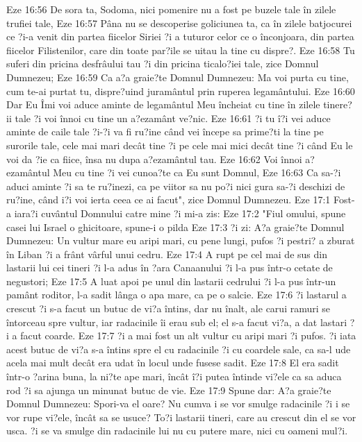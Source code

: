Eze 16:56  De sora ta, Sodoma, nici pomenire nu a fost pe buzele tale în zilele trufiei tale,
Eze 16:57  Pâna nu se descoperise goliciunea ta, ca în zilele batjocurei ce ?i-a venit din partea fiicelor Siriei ?i a tuturor celor ce o înconjoara, din partea fiicelor Filistenilor, care din toate par?ile se uitau la tine cu dispre?.
Eze 16:58  Tu suferi din pricina desfrâului tau ?i din pricina ticalo?iei tale, zice Domnul Dumnezeu;
Eze 16:59  Ca a?a graie?te Domnul Dumnezeu: Ma voi purta cu tine, cum te-ai purtat tu, dispre?uind juramântul prin ruperea legamântului.
Eze 16:60  Dar Eu Îmi voi aduce aminte de legamântul Meu încheiat cu tine în zilele tinere?ii tale ?i voi înnoi cu tine un a?ezamânt ve?nic.
Eze 16:61  ?i tu î?i vei aduce aminte de caile tale ?i-?i va fi ru?ine când vei începe sa prime?ti la tine pe surorile tale, cele mai mari decât tine ?i pe cele mai mici decât tine ?i când Eu le voi da ?ie ca fiice, însa nu dupa a?ezamântul tau.
Eze 16:62  Voi înnoi a?ezamântul Meu cu tine ?i vei cunoa?te ca Eu sunt Domnul,
Eze 16:63  Ca sa-?i aduci aminte ?i sa te ru?inezi, ca pe viitor sa nu po?i nici gura sa-?i deschizi de ru?ine, când i?i voi ierta ceea ce ai facut", zice Domnul Dumnezeu.
Eze 17:1  Fost-a iara?i cuvântul Domnului catre mine ?i mi-a zis:
Eze 17:2  "Fiul omului, spune casei lui Israel o ghicitoare, spune-i o pilda
Eze 17:3  ?i zi: A?a graie?te Domnul Dumnezeu: Un vultur mare eu aripi mari, cu pene lungi, pufos ?i pestri? a zburat în Liban ?i a frânt vârful unui cedru.
Eze 17:4  A rupt pe cel mai de sus din lastarii lui cei tineri ?i l-a adus în ?ara Canaanului ?i l-a pus într-o cetate de negustori;
Eze 17:5  A luat apoi pe unul din lastarii cedrului ?i l-a pus într-un pamânt roditor, l-a sadit lânga o apa mare, ca pe o salcie.
Eze 17:6  ?i lastarul a crescut ?i s-a facut un butuc de vi?a întins, dar nu înalt, ale carui ramuri se întorceau spre vultur, iar radacinile îi erau sub el; el s-a facut vi?a, a dat lastari ?i a facut coarde.
Eze 17:7  ?i a mai fost un alt vultur cu aripi mari ?i pufos. ?i iata acest butuc de vi?a s-a întins spre el cu radacinile ?i cu coardele sale, ca sa-l ude acela mai mult decât era udat în locul unde fusese sadit.
Eze 17:8  El era sadit într-o ?arina buna, la ni?te ape mari, încât î?i putea întinde vi?ele ca sa aduca rod ?i sa ajunga un minunat butuc de vie.
Eze 17:9  Spune dar: A?a graie?te Domnul Dumnezeu: Spori-va el oare? Nu cumva i se vor smulge radacinile ?i i se vor rupe vi?ele, încât sa se usuce? To?i lastarii tineri, care au crescut din el se vor usca. ?i se va smulge din radacinile lui nu cu putere mare, nici cu oameni mul?i.
